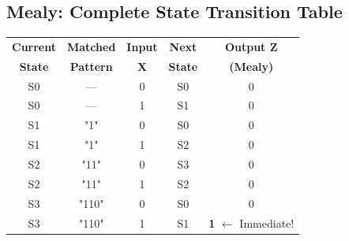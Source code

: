 \documentclass[12pt,a4paper]{article}
\begin{document}
\subsection{Mealy: Complete State Transition Table}
\begin{center}
\begin{tabular}{|c|c|c|c|c|}
\hline
\textbf{Current} & \textbf{Matched} & \textbf{Input} & \textbf{Next} & \textbf{Output Z} \\
\textbf{State} & \textbf{Pattern} & \textbf{X} & \textbf{State} & \textbf{(Mealy)} \\
\hline
S0 & --- & 0 & S0 & 0 \\
S0 & --- & 1 & S1 & 0 \\
\hline
S1 & "1" & 0 & S0 & 0 \\
S1 & "1" & 1 & S2 & 0 \\
\hline
S2 & "11" & 0 & S3 & 0 \\
S2 & "11" & 1 & S2 & 0 \\
\hline
S3 & "110" & 0 & S0 & 0 \\
S3 & "110" & 1 & S1 & \textbf{1} $\leftarrow$ Immediate! \\
\hline
\end{tabular}
\end{center}
\end{document}
